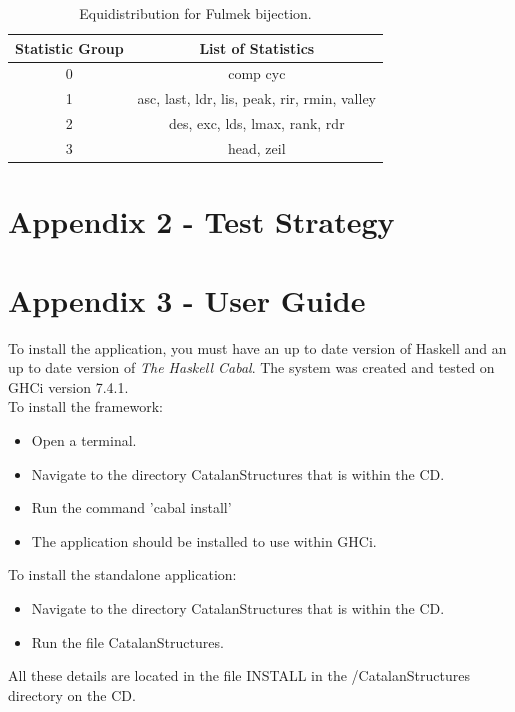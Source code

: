 \documentclass[12pt]{article}
\begin{document}
\begin{table}[H]
\caption{Equidistribution for Fulmek bijection.}
\centering
\begin{tabular}{c | c}
\hline\hline
Statistic Group & List of Statistics \\ [0.5ex]
\hline
0 & {comp cyc} \\
1 & {asc, last, ldr, lis, peak, rir, rmin, valley} \\
2 & {des, exc, lds, lmax, rank, rdr} \\
3 & {head, zeil} 
\hline
\end{tabular}
\label{table:EDFulmekPerms}
\end{table}
\newpage

\section{Appendix 2 - Test Strategy}

\section{Appendix 3 - User Guide}
To install the application, you must have an up to date version of Haskell and an up to date version of {\it The Haskell Cabal}. The system was created and tested on GHCi version 7.4.1.\\
To install the framework:
\begin{itemize}
\item Open a terminal.
\item Navigate to the directory CatalanStructures that is within the CD. 
\item Run the command 'cabal install'
\item The application should be installed to use within GHCi.
\end{itemize}
To install the standalone application:
\begin{itemize}
\item Navigate to the directory CatalanStructures that is within the CD. 
\item Run the file CatalanStructures.
\end{itemize}
All these details are located in the file INSTALL in the /CatalanStructures directory on the CD.
\end{document}

